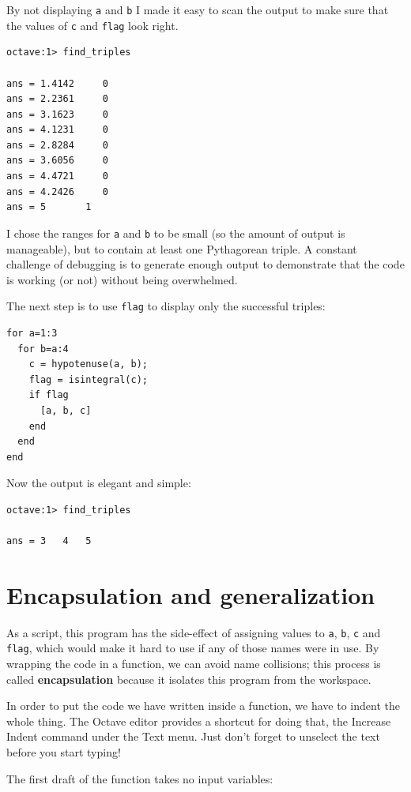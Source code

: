 \documentclass{book}
\begin{document}
By not displaying {\tt a} and {\tt b} I made it easy to scan the
output to make sure that the values of {\tt c} and {\tt flag}
look right.

\begin{verbatim}
octave:1> find_triples

ans = 1.4142     0
ans = 2.2361     0
ans = 3.1623     0
ans = 4.1231     0
ans = 2.8284     0
ans = 3.6056     0
ans = 4.4721     0
ans = 4.2426     0
ans = 5       1
\end{verbatim}

I chose the ranges for {\tt a} and {\tt b} to be small
(so the amount of output is manageable), but to contain at
least one Pythagorean triple. A constant challenge of debugging
is to generate enough output to demonstrate that the code is
working (or not) without being overwhelmed.

The next step is to use {\tt flag} to display only the successful
triples:

\begin{verbatim}
for a=1:3
  for b=a:4
    c = hypotenuse(a, b);
    flag = isintegral(c);
    if flag
      [a, b, c]
    end
  end
end
\end{verbatim}

Now the output is elegant and simple:

\begin{verbatim}
octave:1> find_triples

ans = 3   4   5
\end{verbatim}




\section{Encapsulation and generalization}

As a script, this program has the side-effect of assigning values to
{\tt a}, {\tt b}, {\tt c} and {\tt flag}, which would make it hard to
use if any of those names were in use. By wrapping the code in a
function, we can avoid name collisions; this process is called {\bf
encapsulation} because it isolates this program from the workspace.

In order to put the code we have written inside a function, we
have to indent the whole thing. The Octave editor provides a
shortcut for doing that, the {\sf Increase Indent} command
under the {\sf Text} menu. Just don't forget to unselect the
text before you start typing!

The first draft of the function takes no input variables:
\end{document}
